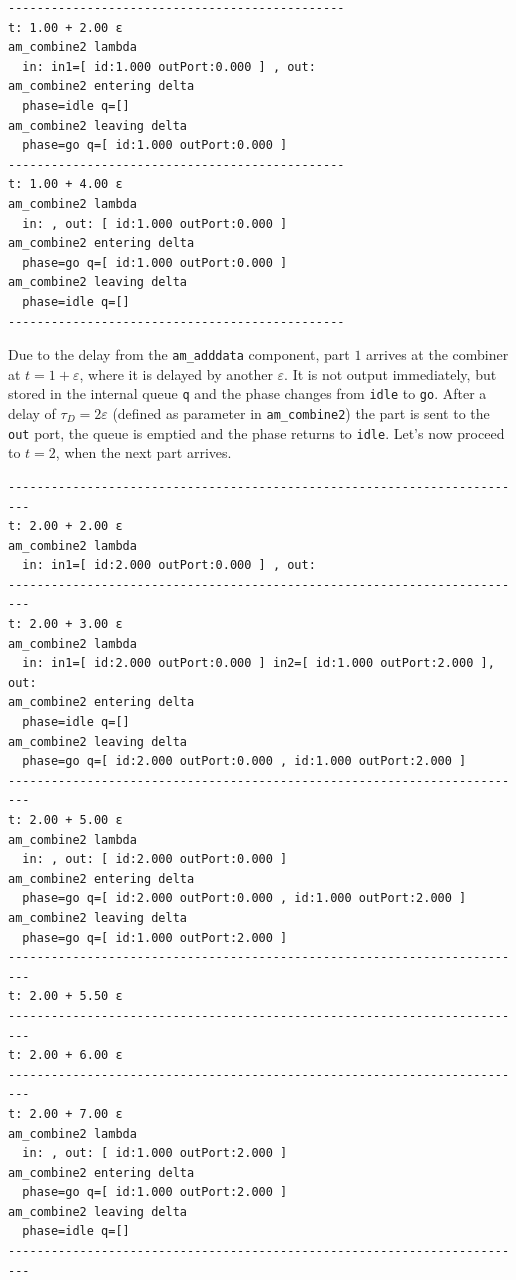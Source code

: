 \documentclass[12pt,oneside,a4paper,bibtotoc,BCOR=0pt,DIV=20]{scrreprt}
\newcommand{\cft}[1]{\mbox{\texttt{#1}}}   %
\newcommand{\epsi}{\varepsilon}
\begin{document}
\begin{verbatim}
-----------------------------------------------
t: 1.00 + 2.00 ε
am_combine2 lambda
  in: in1=[ id:1.000 outPort:0.000 ] , out: 
am_combine2 entering delta
  phase=idle q=[] 
am_combine2 leaving delta
  phase=go q=[ id:1.000 outPort:0.000 ]
-----------------------------------------------
t: 1.00 + 4.00 ε
am_combine2 lambda
  in: , out: [ id:1.000 outPort:0.000 ]
am_combine2 entering delta
  phase=go q=[ id:1.000 outPort:0.000 ]
am_combine2 leaving delta
  phase=idle q=[]
-----------------------------------------------
\end{verbatim}

Due to the delay from the \cft{am\_adddata} component, part $1$ arrives at the
combiner at $t = 1 + \epsi$, where it is delayed by another $\epsi$. It is not
output immediately, but stored in the internal queue \cft{q} and the phase
changes from \cft{idle} to \cft{go}. After a delay of $\tau_D = 2\epsi$
(defined as parameter in \cft{am\_combine2}) the part is sent to the \cft{out}
port, the queue is emptied and the phase returns to \cft{idle}. Let's now
proceed to $t = 2$, when the next part arrives.


\begin{verbatim}
-------------------------------------------------------------------------
t: 2.00 + 2.00 ε
am_combine2 lambda
  in: in1=[ id:2.000 outPort:0.000 ] , out: 
-------------------------------------------------------------------------
t: 2.00 + 3.00 ε
am_combine2 lambda
  in: in1=[ id:2.000 outPort:0.000 ] in2=[ id:1.000 outPort:2.000 ], out:
am_combine2 entering delta
  phase=idle q=[] 
am_combine2 leaving delta
  phase=go q=[ id:2.000 outPort:0.000 , id:1.000 outPort:2.000 ]
-------------------------------------------------------------------------
t: 2.00 + 5.00 ε
am_combine2 lambda
  in: , out: [ id:2.000 outPort:0.000 ]
am_combine2 entering delta
  phase=go q=[ id:2.000 outPort:0.000 , id:1.000 outPort:2.000 ]
am_combine2 leaving delta
  phase=go q=[ id:1.000 outPort:2.000 ]
-------------------------------------------------------------------------
t: 2.00 + 5.50 ε
-------------------------------------------------------------------------
t: 2.00 + 6.00 ε
-------------------------------------------------------------------------
t: 2.00 + 7.00 ε
am_combine2 lambda
  in: , out: [ id:1.000 outPort:2.000 ]
am_combine2 entering delta
  phase=go q=[ id:1.000 outPort:2.000 ]
am_combine2 leaving delta
  phase=idle q=[] 
-------------------------------------------------------------------------
\end{verbatim}
\end{document}
